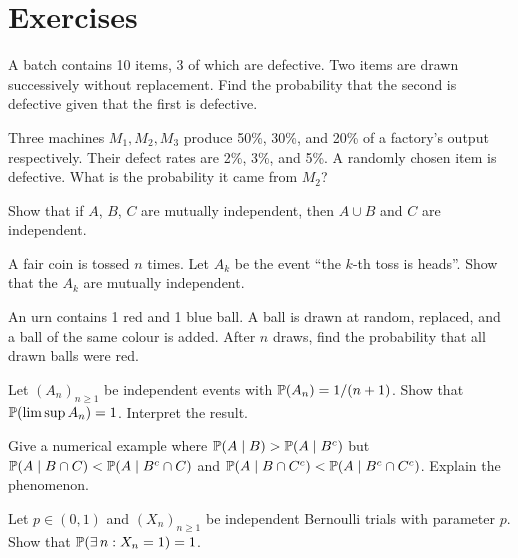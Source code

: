 \section{Exercises}

\begin{exercise}
A batch contains 10 items, 3 of which are defective. Two items are drawn
successively without replacement. Find the probability that the second is
defective given that the first is defective.
\end{exercise}

\begin{exercise}
Three machines $M_1, M_2, M_3$ produce 50\%, 30\%, and 20\% of a factory's
output respectively. Their defect rates are 2\%, 3\%, and 5\%. A randomly chosen
item is defective. What is the probability it came from $M_2$?
\end{exercise}

\begin{exercise}
Show that if $A$, $B$, $C$ are mutually independent, then $A \cup B$ and $C$
are independent.
\end{exercise}

\begin{exercise}
A fair coin is tossed $n$ times. Let $A_k$ be the event ``the $k$-th toss is
heads''. Show that the $A_k$ are mutually independent.
\end{exercise}

\begin{exercise}
An urn contains 1 red and 1 blue ball. A ball is drawn at random, replaced, and
a ball of the same colour is added. After $n$ draws, find the probability that
all drawn balls were red.
\end{exercise}

\begin{exercise}
Let $(A_n)_{n \geq 1}$ be independent events with $\mathbb{P}(A_n) = 1/(n+1)$.
Show that $\mathbb{P}(\limsup A_n) = 1$. Interpret the result.
\end{exercise}

\begin{exercise}
Give a numerical example where $\mathbb{P}(A \mid B) > \mathbb{P}(A \mid B^c)$ but
$\mathbb{P}(A \mid B \cap C) < \mathbb{P}(A \mid B^c \cap C)$ and
$\mathbb{P}(A \mid B \cap C^c) < \mathbb{P}(A \mid B^c \cap C^c)$. Explain the phenomenon.
\end{exercise}

\begin{exercise}
Let $p \in (0,1)$ and $(X_n)_{n \geq 1}$ be independent Bernoulli trials with
parameter $p$. Show that $\mathbb{P}(\exists\, n : X_n = 1) = 1$.
\end{exercise}
